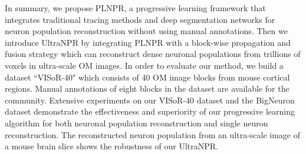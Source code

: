 In summary, we propose PLNPR, a progressive learning framework that integrates traditional tracing methods and deep segmentation networks for neuron population reconstruction without using manual annotations.
%
Then we introduce UltraNPR by integrating PLNPR with a block-wise propagation and fusion strategy which can reconstruct dense neuronal populations from trillions of voxels in ultra-scale OM images. 
%
In order to evaluate our method, we build a dataset ``VISoR-40" which consists of 40 OM image blocks from mouse cortical regions. Manual annotations of eight blocks in the dataset are available for the community. Extensive experiments on our VISoR-40 dataset and the BigNeuron dataset demonstrate the effectiveness and superiority of our progressive learning algorithm for both neuronal population reconstruction and single neuron reconstruction.
The reconstructed neuron population from an ultra-scale image of a mouse brain slice shows the robustness of our UltraNPR.





